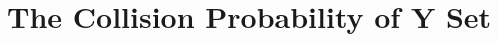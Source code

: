 \documentclass{article}
\begin{document}
\section{The Collision Probability of Y Set}
\end{document}
